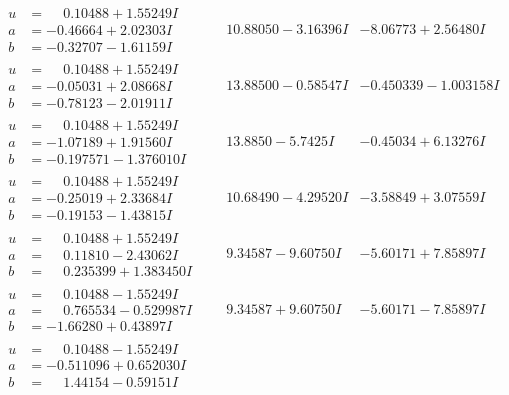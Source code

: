 \documentclass[1p]{elsarticle_modified}
\theoremstyle{definition}
\begin{document}
$$\begin{array}{c|c|c}
\begin{aligned}
u &= \phantom{-}0.10488 + 1.55249 I \\
a &= -0.46664 + 2.02303 I \\
b &= -0.32707 - 1.61159 I\end{aligned}
 & \phantom{-}10.88050 - 3.16396 I & -8.06773 + 2.56480 I \\ \hline\begin{aligned}
u &= \phantom{-}0.10488 + 1.55249 I \\
a &= -0.05031 + 2.08668 I \\
b &= -0.78123 - 2.01911 I\end{aligned}
 & \phantom{-}13.88500 - 0.58547 I & -0.450339 - 1.003158 I \\ \hline\begin{aligned}
u &= \phantom{-}0.10488 + 1.55249 I \\
a &= -1.07189 + 1.91560 I \\
b &= -0.197571 - 1.376010 I\end{aligned}
 & \phantom{-}13.8850 - 5.7425 I & -0.45034 + 6.13276 I \\ \hline\begin{aligned}
u &= \phantom{-}0.10488 + 1.55249 I \\
a &= -0.25019 + 2.33684 I \\
b &= -0.19153 - 1.43815 I\end{aligned}
 & \phantom{-}10.68490 - 4.29520 I & -3.58849 + 3.07559 I \\ \hline\begin{aligned}
u &= \phantom{-}0.10488 + 1.55249 I \\
a &= \phantom{-}0.11810 - 2.43062 I \\
b &= \phantom{-}0.235399 + 1.383450 I\end{aligned}
 & \phantom{-}9.34587 - 9.60750 I & -5.60171 + 7.85897 I \\ \hline\begin{aligned}
u &= \phantom{-}0.10488 - 1.55249 I \\
a &= \phantom{-}0.765534 - 0.529987 I \\
b &= -1.66280 + 0.43897 I\end{aligned}
 & \phantom{-}9.34587 + 9.60750 I & -5.60171 - 7.85897 I \\ \hline\begin{aligned}
u &= \phantom{-}0.10488 - 1.55249 I \\
a &= -0.511096 + 0.652030 I \\
b &= \phantom{-}1.44154 - 0.59151 I\end{aligned}

\end{array}$$
\end{document}
